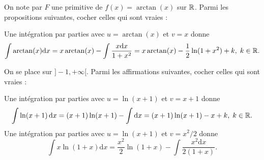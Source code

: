 \begin{question}
On note par $F$ une primitive de $f(x)=\arctan (x)$ sur $\mathbb{R}$. Parmi les propositions suivantes, cocher celles qui sont vraies :
\begin{answers}  
\end{answers}
\begin{explanations}
Une intégration par parties avec $u=\arctan (x)$ et $v=x$ donne
$$\int \arctan (x)\mathrm{d}x=x\arctan (x)-\int \frac{x\mathrm{d}x}{1+x^2}=x\arctan (x)-\frac{1}{2}\ln (1+x^2)+k,\; k\in \mathbb{R}.$$
\end{explanations}
\end{question}

\begin{question}
On se place sur $]-1,+\infty[$. Parmi les affirmations suivantes, cocher celles qui sont vraies :
\begin{answers}  
\end{answers}
\begin{explanations}
Une intégration par parties avec $u=\ln (x+1)$ et $v=x+1$ donne
$$\int \ln (x+1)\, \mathrm{d}x=(x+1)\ln (x+1)-\int \mathrm{d}x=(x+1)\ln (x+1)-x+k,\; k\in \mathbb{R}.$$
Une intégration par parties avec $u=\ln (x+1)$ et $v=x^2/2$ donne
$$\int x\ln (1+x)\mathrm{d}x=\frac{x^2}{2}\ln (1+x)-\int \frac{x^2\mathrm{d}x}{2(1+x)}.$$
\end{explanations}
\end{question}


